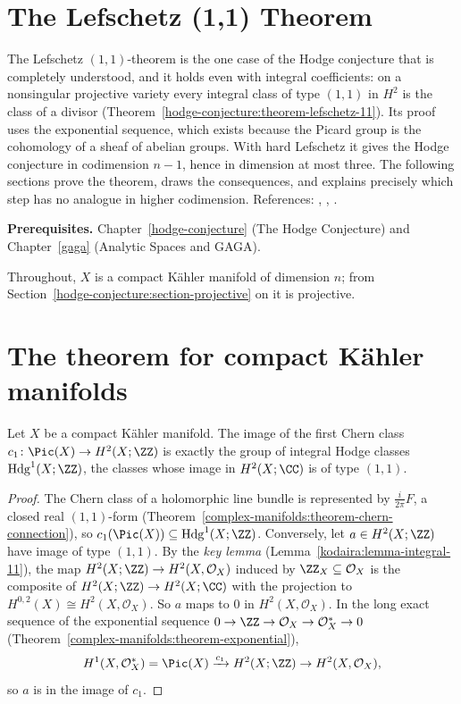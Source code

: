 \section{The Lefschetz (1,1) Theorem}\label{hodge-conjecture:section-lefschetz-11}
The Lefschetz $(1,1)$-theorem is the one case of the Hodge conjecture that is completely understood, and it holds even with integral coefficients: on a
nonsingular projective variety every integral class of type $(1,1)$ in $H^2$ is the class of a divisor (Theorem~\ref{hodge-conjecture:theorem-lefschetz-11}). Its proof
uses the exponential sequence, which exists because the Picard group is the cohomology of a sheaf of abelian groups. With hard Lefschetz it gives the Hodge conjecture
in codimension $n - 1$, hence in dimension at most three. The following sections prove the theorem, draws the consequences, and explains precisely which step has no analogue in
higher codimension. References: \cite[Chapter 1, Section 1]{griffiths-harris}, \cite[Section 11.3]{voisin-hodge-1}, \cite{kodaira-spencer-1953}.

\noindent\textbf{Prerequisites.} Chapter~\ref{hodge-conjecture} (The Hodge Conjecture) and Chapter~\ref{gaga} (Analytic Spaces and GAGA).

Throughout, $X$ is a compact K\"ahler manifold of dimension $n$; from Section~\ref{hodge-conjecture:section-projective} on it is projective.

\section{The theorem for compact K\"ahler manifolds}\label{hodge-conjecture:section-kahler}

\begin{theorem}\label{hodge-conjecture:theorem-kahler}
Let $X$ be a compact K\"ahler manifold. The image of the first Chern class $c_1 \colon \Pic(X) \to H^2(X; \ZZ)$ is exactly the group of integral Hodge classes
$\mathrm{Hdg}^1(X; \ZZ)$, the classes whose image in $H^2(X; \CC)$ is of type $(1,1)$.
\end{theorem}

\begin{proof}
The Chern class of a holomorphic line bundle is represented by $\frac{i}{2\pi}F$, a closed real $(1,1)$-form (Theorem~\ref{complex-manifolds:theorem-chern-connection}), so
$c_1(\Pic(X)) \subseteq \mathrm{Hdg}^1(X; \ZZ)$. Conversely, let $a \in H^2(X; \ZZ)$ have image of type $(1,1)$. By the \emph{key lemma} (Lemma~\ref{kodaira:lemma-integral-11}), the map
$H^2(X; \ZZ) \to H^2(X, \mathcal{O}_X)$ induced by $\ZZ_X \subseteq \mathcal{O}_X$ is the composite of $H^2(X; \ZZ) \to H^2(X; \CC)$ with the projection to $H^{0,2}(X) \cong H^2(X, \mathcal{O}_X)$.
So $a$ maps to $0$ in $H^2(X, \mathcal{O}_X)$. In the long exact sequence of the exponential sequence $0 \to \ZZ \to \mathcal{O}_X \to \mathcal{O}_X^* \to 0$
(Theorem~\ref{complex-manifolds:theorem-exponential}),
\[
H^1(X, \mathcal{O}_X^*) = \Pic(X) \xrightarrow{c_1} H^2(X; \ZZ) \to H^2(X, \mathcal{O}_X),
\]
so $a$ is in the image of $c_1$.
\end{proof}

